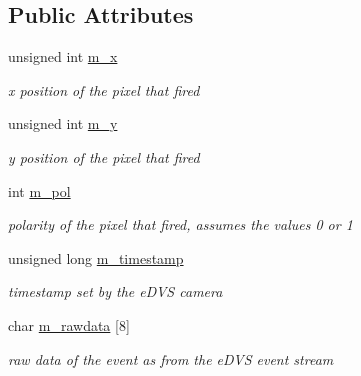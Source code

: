 \subsection*{Public Attributes}
\begin{DoxyCompactItemize}
\item 
\hypertarget{struct_e_d_v_s4337_serial_u_s_b_event_a8f1a90c369140ba5abf9a6d0ef309e12}{}unsigned int \hyperlink{struct_e_d_v_s4337_serial_u_s_b_event_a8f1a90c369140ba5abf9a6d0ef309e12}{m\+\_\+x}\label{struct_e_d_v_s4337_serial_u_s_b_event_a8f1a90c369140ba5abf9a6d0ef309e12}

\begin{DoxyCompactList}\small\item\em x position of the pixel that fired \end{DoxyCompactList}\item 
\hypertarget{struct_e_d_v_s4337_serial_u_s_b_event_a397b869776253fac7c2b2ac59b8b3cbe}{}unsigned int \hyperlink{struct_e_d_v_s4337_serial_u_s_b_event_a397b869776253fac7c2b2ac59b8b3cbe}{m\+\_\+y}\label{struct_e_d_v_s4337_serial_u_s_b_event_a397b869776253fac7c2b2ac59b8b3cbe}

\begin{DoxyCompactList}\small\item\em y position of the pixel that fired \end{DoxyCompactList}\item 
\hypertarget{struct_e_d_v_s4337_serial_u_s_b_event_ad7f69be52ec9ba031c5ee2f89a881f65}{}int \hyperlink{struct_e_d_v_s4337_serial_u_s_b_event_ad7f69be52ec9ba031c5ee2f89a881f65}{m\+\_\+pol}\label{struct_e_d_v_s4337_serial_u_s_b_event_ad7f69be52ec9ba031c5ee2f89a881f65}

\begin{DoxyCompactList}\small\item\em polarity of the pixel that fired, assumes the values 0 or 1 \end{DoxyCompactList}\item 
\hypertarget{struct_e_d_v_s4337_serial_u_s_b_event_abfbb4fa439b43c69638a9f0a9d596afe}{}unsigned long \hyperlink{struct_e_d_v_s4337_serial_u_s_b_event_abfbb4fa439b43c69638a9f0a9d596afe}{m\+\_\+timestamp}\label{struct_e_d_v_s4337_serial_u_s_b_event_abfbb4fa439b43c69638a9f0a9d596afe}

\begin{DoxyCompactList}\small\item\em timestamp set by the e\+D\+V\+S camera \end{DoxyCompactList}\item 
\hypertarget{struct_e_d_v_s4337_serial_u_s_b_event_af3cef2482b5d7beb1d6297b27db7aa2d}{}char \hyperlink{struct_e_d_v_s4337_serial_u_s_b_event_af3cef2482b5d7beb1d6297b27db7aa2d}{m\+\_\+rawdata} \mbox{[}8\mbox{]}\label{struct_e_d_v_s4337_serial_u_s_b_event_af3cef2482b5d7beb1d6297b27db7aa2d}

\begin{DoxyCompactList}\small\item\em raw data of the event as from the e\+D\+V\+S event stream \end{DoxyCompactList}\end{DoxyCompactItemize}


